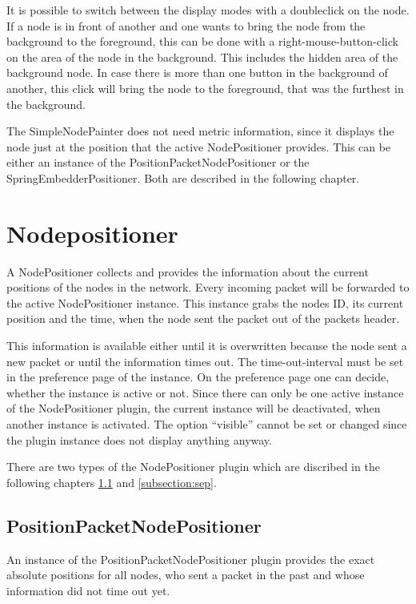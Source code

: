 It is possible to switch between the display modes with a doubleclick on the node. If a node is in front of another and one
wants to bring the node from the background to the foreground, this can be done with a right-mouse-button-click on
the area of the node in the background. This includes the hidden area of the background node.
In case there is more than one button in the background of another, this click will
bring the node to the foreground, that was the furthest in the background.

The SimpleNodePainter does not need metric information, since it displays the node just at the position that the active
NodePositioner provides. This can be either an instance of the PositionPacketNodePositioner or the SpringEmbedderPositioner.
Both are described in the following chapter.

\newpage
\section{Nodepositioner}

A NodePositioner collects and provides the information about the current positions of the nodes in the network. Every incoming
packet will be forwarded to the active NodePositioner instance. This instance grabs the nodes ID, its current position and
the time, when the node sent the packet out of the packets header.

This information is available either until it is overwritten
because the node sent a new packet or until the information times out. The time-out-interval must be set in the preference page
of the instance. On the preference page one can decide, whether the instance is active or not. Since there can only be one
active instance of the NodePositioner plugin, the current instance will be deactivated, when another instance is activated.
The option ``visible'' cannot be set or changed since the plugin instance does not display anything anyway.

There are two types of the NodePositioner plugin which are discribed in the following chapters \ref{subsection:ppnp} and
\ref{subsection:sep}.

\subsection{PositionPacketNodePositioner}
\label{subsection:ppnp}

An instance of the PositionPacketNodePositioner plugin provides the exact absolute positions for all nodes, who sent
a packet in the past and whose information did not time out yet.

